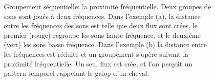 \begin{figure}[bth]
        \myfloatalign
        \caption[Groupement séquentiel : proximité fréquentielle.]{Groupement séquentielle: la proximité fréquentielle. Deux groupes de sons sont joués à deux fréquences. Dans l'exemple (a), la distance entre les fréquences des sons est telle que deux flux sont crées, le premier (rouge) regroupe les sons haute fréquence, et le deuxième (vert) les sons basse fréquence. Dans l'exemple (b) la distance entre les fréquences est réduite et un groupement s'opère suivant la proximité fréquentielle. Un seul flux est crée, et l'on perçoit un pattern temporel rappelant le galop d'un cheval.}\label{fig:galop}
\end{figure}

